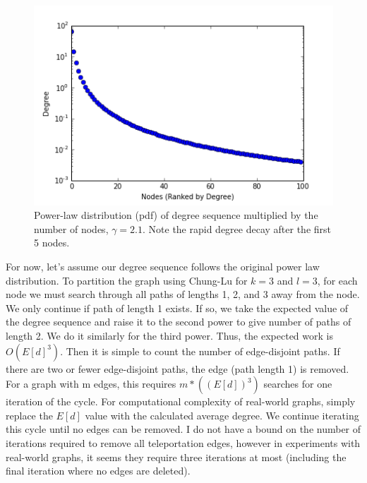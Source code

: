 \documentclass{article}
\begin{document}
\begin{figure}
\begin{center}
\includegraphics[width=\linewidth]{powerlawdeg.png}
  \caption{Power-law distribution (pdf) of degree sequence multiplied by the number of nodes, $\gamma = 2.1$. Note the rapid degree decay after the first 5 nodes.}
  \end{center}
  \end{figure}

For now, let's assume our degree sequence follows the original power law distribution. To partition the graph using Chung-Lu for $k = 3$ and $l = 3$, for each node we must search through all paths of lengths 1, 2, and 3 away from the node. We only continue if path of length 1 exists. If so, we take the expected value of the degree sequence and raise it to the second power to give number of paths of length 2. We do it similarly for the third power. Thus, the expected work is $O(E[d]^3)$. Then it is simple to count the number of edge-disjoint paths. If there are two or fewer edge-disjoint paths, the edge (path length 1) is removed. For a graph with m edges, this requires $m*((E[d])^{3})$ searches for one iteration of the cycle. For computational complexity of real-world graphs, simply replace the $E[d]$ value with the calculated average degree. We continue iterating this cycle until no edges can be removed. I do not have a bound on the number of iterations required to remove all teleportation edges, however in experiments with real-world graphs, it seems they require three iterations at most (including the final iteration where no edges are deleted).
\end{document}
